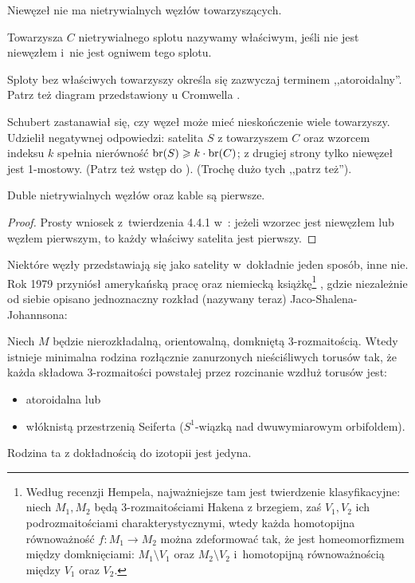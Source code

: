 Niewęzeł nie ma nietrywialnych węzłów towarzyszących.

\begin{definition}
    Towarzysza $C$ nietrywialnego splotu nazywamy właściwym, jeśli nie jest niewęzłem i~nie jest ogniwem tego splotu.
\end{definition}

Sploty bez właściwych towarzyszy określa się zazwyczaj terminem ,,atoroidalny''.
%
Patrz też diagram przedstawiony u Cromwella \cite[s. 83]{cromwell2004}.

Schubert \cite{schubert1954} zastanawiał się, czy węzeł może mieć nieskończenie wiele towarzyszy.
Udzielił negatywnej odpowiedzi: satelita $S$ z towarzyszem $C$ oraz wzorcem indeksu $k$ spełnia nierówność $\operatorname{br}(S) \geqslant k \cdot \operatorname{br}(C)$; z drugiej strony tylko niewęzeł jest 1-mostowy.
(Patrz też wstęp do \cite{schultens2003}).
(Trochę dużo tych ,,patrz też'').

\begin{proposition}
    Duble nietrywialnych węzłów oraz kable są pierwsze.
\end{proposition}

\begin{proof}
    Prosty wniosek z~twierdzenia 4.4.1 w~\cite[s. 84]{cromwell2004}: jeżeli wzorzec jest niewęzłem lub węzłem pierwszym, to każdy właściwy satelita jest pierwszy.
\end{proof}

Niektóre węzły przedstawiają się jako satelity w~dokładnie jeden sposób, inne nie.
Rok 1979 przyniósł amerykańską pracę \cite{jaco1979} oraz niemiecką książkę\footnote{Według recenzji Hempela, najważniejsze tam jest twierdzenie klasyfikacyjne: niech $M_1, M_2$ będą 3-rozmaitościami Hakena  z brzegiem, zaś $V_1, V_2$ ich podrozmaitościami charakterystycznymi, wtedy każda homotopijna równoważność $f \colon M_1 \to M_2$ można zdeformować tak, że jest homeomorfizmem między domknięciami: $M_1 \setminus V_1$ oraz $M_2 \setminus V_2$ i~homotopijną równoważnością między $V_1$ oraz $V_2$.} \cite{johannson1979}, gdzie niezależnie od siebie opisano jednoznaczny rozkład (nazywany teraz) Jaco-Shalena-Johannsona:
%
%
%
%

\begin{proposition}
    Niech $M$ będzie nierozkładalną, orientowalną, domkniętą 3-rozmaitością.
    Wtedy istnieje minimalna rodzina rozłącznie zanurzonych nieściśliwych torusów tak, że każda składowa 3-rozmaitości powstałej przez rozcinanie wzdłuż torusów jest:
    \begin{itemize}
        \item atoroidalna lub
    \item włóknistą przestrzenią Seiferta ($S^1$-wiązką nad dwuwymiarowym orbifoldem).    \end{itemize}
%
%
%
%
    Rodzina ta z dokładnością do izotopii jest jedyna.
\end{proposition}

